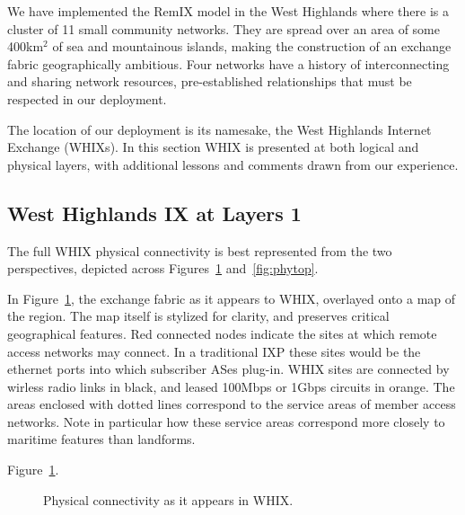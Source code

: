 
We have implemented the RemIX model in the West Highlands where there
is a cluster of
11 small community networks. They are spread over an area of some 400km$^2$
 of sea and mountainous islands, making the
construction of an exchange fabric geographically ambitious. Four networks have
a history of interconnecting and sharing network resources, pre-established
relationships that must be respected in our deployment. 

The location of our deployment is its namesake, the West Highlands Internet
Exchange (\acp{WHIX}). In this section WHIX is presented at both logical and
physical layers, with additional lessons and comments drawn from our experience.



\subsection{West Highlands IX at Layers 1}

The full WHIX physical connectivity is best represented from the two perspectives, depicted across Figures~\ref{fig:whixmap} and~\ref{fig:phytop}. 

In Figure~\ref{fig:whixmap}, the exchange fabric as it appears to WHIX,
overlayed onto a map of the region. The map itself is stylized for clarity, and
preserves critical geographical features. Red connected nodes indicate the sites
at which remote access networks may connect. In a traditional IXP these sites
would be the ethernet ports into which subscriber ASes plug-in. WHIX sites are
connected by wirless radio links in black, and leased 100Mbps or 1Gbps circuits
in orange. The areas enclosed with dotted lines correspond to the service areas
of member access networks.  Note in
particular how these service areas correspond more  closely to maritime features
than landforms.

Figure~\ref{fig:whixmap}. 
\begin{figure}[h]
  \resizebox{\linewidth}{!}{
    \begin{tikzpicture}
      \whixphysicaldiagram
    \end{tikzpicture}
  }
  \caption{Physical connectivity as it appears in \acf{WHIX}.}
  \label{fig:whixmap}
\end{figure}

